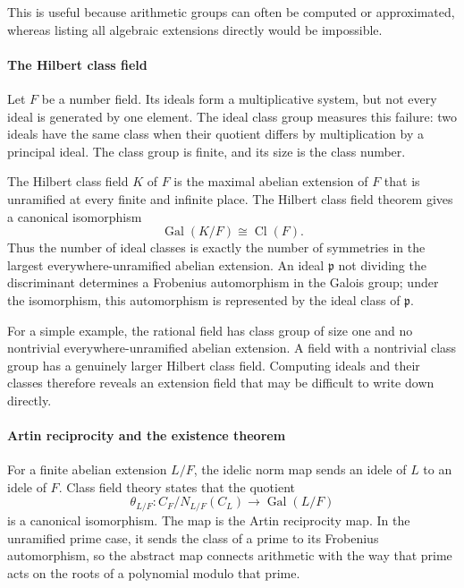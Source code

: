This is useful because arithmetic groups can often be computed or approximated, whereas listing all algebraic extensions directly would be impossible.

\paragraph{The Hilbert class field}

Let $F$ be a number field. Its ideals form a multiplicative system, but not every ideal is generated by one element. The ideal class group measures this failure: two ideals have the same class when their quotient differs by multiplication by a principal ideal. The class group is finite, and its size is the class number.

The Hilbert class field $K$ of $F$ is the maximal abelian extension of $F$ that is unramified at every finite and infinite place. The Hilbert class field theorem gives a canonical isomorphism
\[
 \operatorname{Gal}(K/F)\cong \operatorname{Cl}(F).
\]
Thus the number of ideal classes is exactly the number of symmetries in the largest everywhere-unramified abelian extension. An ideal $\mathfrak p$ not dividing the discriminant determines a Frobenius automorphism in the Galois group; under the isomorphism, this automorphism is represented by the ideal class of $\mathfrak p$. \cite{class_field_theory_ref1,class_field_theory_ref2}

For a simple example, the rational field has class group of size one and no nontrivial everywhere-unramified abelian extension. A field with a nontrivial class group has a genuinely larger Hilbert class field. Computing ideals and their classes therefore reveals an extension field that may be difficult to write down directly.

\paragraph{Artin reciprocity and the existence theorem}

For a finite abelian extension $L/F$, the idelic norm map sends an idele of $L$ to an idele of $F$. Class field theory states that the quotient
\[
 \theta_{L/F}:C_F/N_{L/F}(C_L)\longrightarrow \operatorname{Gal}(L/F)
\]
is a canonical isomorphism. The map is the Artin reciprocity map. In the unramified prime case, it sends the class of a prime to its Frobenius automorphism, so the abstract map connects arithmetic with the way that prime acts on the roots of a polynomial modulo that prime. \cite{class_field_theory_ref1,class_field_theory_ref4}


